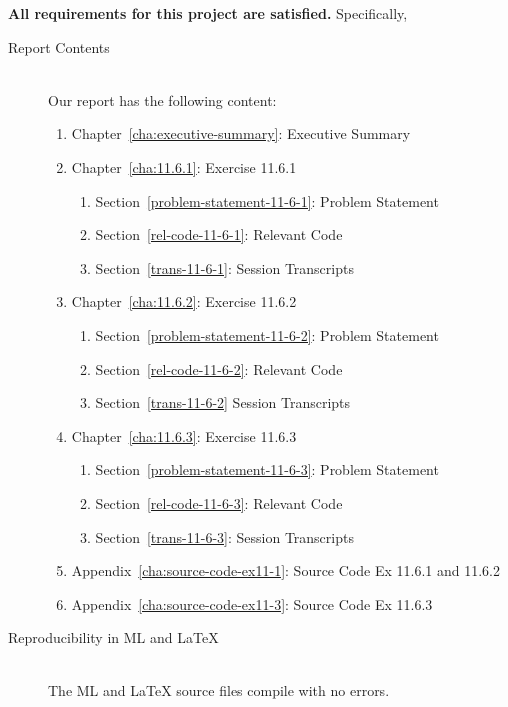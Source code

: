 \documentclass{report}
\begin{document}
\textbf{All requirements for this project are satisfied.}
Specifically,
\begin{description}
\item[Report Contents] \ \\
  Our report has the following content:
  \begin{enumerate}[{}]
  \item Chapter~\ref{cha:executive-summary}: Executive Summary
  \item Chapter~\ref{cha:11.6.1}: Exercise 11.6.1
    \begin{enumerate}[{}]
    \item Section~\ref{problem-statement-11-6-1}: Problem Statement
    \item Section~\ref{rel-code-11-6-1}: Relevant Code 
    \item Section~\ref{trans-11-6-1}: Session Transcripts
    \end{enumerate}
  \item Chapter~\ref{cha:11.6.2}: Exercise 11.6.2
    \begin{enumerate}[{}]
    \item Section~\ref{problem-statement-11-6-2}: Problem Statement
    \item Section~\ref{rel-code-11-6-2}: Relevant Code
    \item Section~\ref{trans-11-6-2} Session Transcripts
    \end{enumerate}
  \item Chapter~\ref{cha:11.6.3}: Exercise 11.6.3
    \begin{enumerate}[{}]
    \item Section~\ref{problem-statement-11-6-3}: Problem Statement
    \item Section~\ref{rel-code-11-6-3}: Relevant Code
    \item Section~\ref{trans-11-6-3}: Session Transcripts
    \end{enumerate}
 \item Appendix~\ref{cha:source-code-ex11-1}: Source Code Ex 11.6.1 and 11.6.2
 \item Appendix~\ref{cha:source-code-ex11-3}: Source Code Ex 11.6.3
  \end{enumerate}
\item[Reproducibility in ML and \LaTeX{}] \ \\
  The ML and \LaTeX{} source files compile with no errors.
\end{description}
\end{document}
